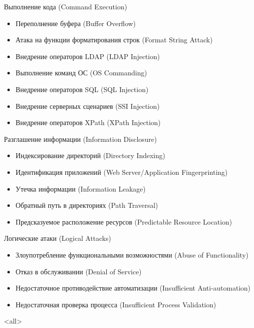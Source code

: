 \begin{frame}{Выполнение кода (Command Execution)}
	\begin{itemize}
		\item Переполнение буфера (Buffer Overflow)
		\item Атака на функции форматирования строк (Format String Attack)
		\item Внедрение операторов LDAP (LDAP Injection)
		\item Выполнение команд ОС (OS Commanding)
		\item Внедрение операторов SQL (SQL Injection)
		\item Внедрение  серверных сценариев (SSI Injection)
		\item Внедрение операторов XPath (XPath Injection)
	\end{itemize}

\end{frame}


\begin{frame}{Разглашение информации (Information Disclosure)}
	\begin{itemize}
		\item Индексирование директорий (Directory Indexing)
		\item Идентификация приложений (Web Server/Application Fingerprinting)
		\item Утечка информации (Information Leakage)
		\item Обратный путь в директориях (Path Traversal)
		\item Предсказуемое расположение ресурсов (Predictable Resource Location)
	\end{itemize}

\end{frame}


\begin{frame}{Логические атаки (Logical Attacks)}
	\begin{itemize}
		\item Злоупотребление функциональными возможностями (Abuse of Functionality)
		\item Отказ в обслуживании (Denial of Service)
		\item Недостаточное противодействие автоматизации (Insufficient Anti-automation)
		\item Недостаточная проверка процесса (Insufficient Process Validation)
	\end{itemize}

\end{frame}
\mode<all>{}


